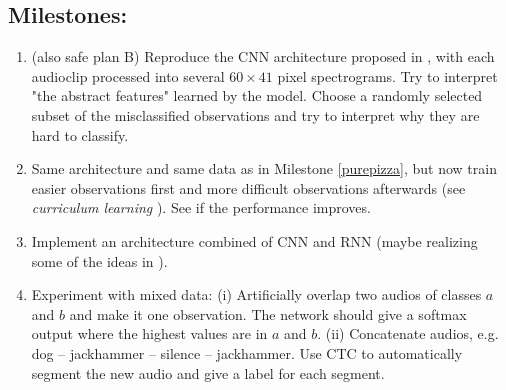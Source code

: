 \documentclass[utf-8]{article}
\begin{document}
\subsection*{Milestones:} %
\begin{enumerate}
\item (also safe plan B) Reproduce the CNN architecture proposed in \cite{pizza}, with each audioclip processed into several $60\times41$ pixel spectrograms. Try to interpret "the abstract features" learned by the model. Choose a randomly selected subset of the misclassified observations and try to interpret why they are hard to classify.\label{purepizza}
\item Same architecture and same data as in Milestone \ref{purepizza}, but now train easier observations first and more difficult observations afterwards (see \textit{curriculum learning} \cite{curr}). See if the performance improves.
\item Implement an architecture combined of CNN and RNN (maybe realizing some of the ideas in \cite{deepspeech}). %
\label{cnnrnn} %

\item %
Experiment with mixed data:
(i) Artificially overlap two audios of classes $a$ and $b$ and make it one observation. The network should give a softmax output where the highest values are in $a$ and $b$.  
(ii) Concatenate audios, e.g. dog -- jackhammer -- silence -- jackhammer. Use CTC\cite{ctc, ctctf} to  automatically segment the new audio and give a label for each segment.  
\end{enumerate}
\end{document}
